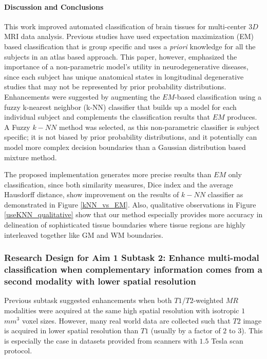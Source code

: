 \paragraph{Discussion and Conclusions} %

This work improved automated classification of brain tissues for multi-center $3D$ MRI data analysis. Previous studies have used expectation maximization (EM) based classification that is group specific and uses a \emph{priori} knowledge for all the subjects in an atlas based approach.
This paper, however, emphasized the importance of a non-parametric model's utility in neurodegenerative diseases, since each subject has unique anatomical states in longitudinal degenerative studies that may not be represented by prior probability distributions. Enhancements were suggested by augmenting the $EM$-based classification using a fuzzy k-nearest neighbor (k-NN) classifier that builds up a model for each individual subject and complements the classification results that $EM$ produces.
A Fuzzy $k-NN$ method was selected, as this non-parametric classifier is subject specific; it is not biased by prior probability distributions, and it potentially can model more complex decision boundaries than a Gaussian distribution based mixture method.

The proposed implementation generates more precise results than $EM$ only classification, since both similarity measures, Dice index and the average Hausdorff distance, show improvement on the results of $k-NN$ classifier as demonstrated in Figure \ref{kNN_vs_EM}.
Also, qualitative observations in Figure \ref{useKNN_qualitative} show that our method especially provides more accuracy in delineation of sophisticated tissue boundaries where tissue regions are highly interleaved together like GM and WM boundaries.
\newline

\subsubsection{Research Design for Aim 1 Subtask 2: Enhance multi-modal classification when complementary information comes from a second modality with lower spatial resolution}
\label{section:Aim1Subtask2ResearchDesign} %

Previous subtask suggested enhancements when both $T1$/$T2$-weighted $MR$ modalities were acquired at the same high spatial resolution with isotropic $1$ $mm^{3}$ voxel sizes. However, many real world data are collected such that $T2$ image is acquired in lower spatial resolution than $T1$ (usually by a factor of $2$ to $3$). This is especially the case in datasets provided from scanners with $1.5$ Tesla scan protocol.

